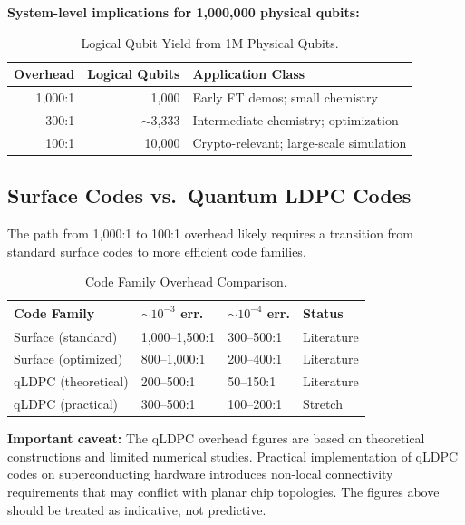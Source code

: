 \documentclass[conference]{IEEEtran}
\begin{document}
\textbf{System-level implications for 1,000,000 physical qubits:}

\begin{table}[htbp]
\centering
\caption{Logical Qubit Yield from 1M Physical Qubits.}
\label{tab:logical_yield}
\begin{tabular}{rrp{3.5cm}}
\toprule
\textbf{Overhead} & \textbf{Logical Qubits} & \textbf{Application Class} \\
\midrule
1,000:1 & 1,000 & Early FT demos; small chemistry \\
300:1 & ${\sim}$3,333 & Intermediate chemistry; optimization \\
100:1 & 10,000 & Crypto-relevant; large-scale simulation \\
\bottomrule
\end{tabular}
\end{table}

\subsection{Surface Codes vs.\ Quantum LDPC Codes}

The path from 1,000:1 to 100:1 overhead likely requires a transition from standard surface codes to more efficient code families.

\begin{table}[htbp]
\centering
\caption{Code Family Overhead Comparison.}
\label{tab:code_families}
\begin{tabular}{lllp{1.5cm}}
\toprule
\textbf{Code Family} & \textbf{${\sim}10^{-3}$ err.} & \textbf{${\sim}10^{-4}$ err.} & \textbf{Status} \\
\midrule
Surface (standard) & 1,000--1,500:1 & 300--500:1 & Literature \\
Surface (optimized) & 800--1,000:1 & 200--400:1 & Literature \\
qLDPC (theoretical) & 200--500:1 & 50--150:1 & Literature \\
qLDPC (practical) & 300--500:1 & 100--200:1 & Stretch \\
\bottomrule
\end{tabular}
\end{table}

\textbf{Important caveat:} The qLDPC overhead figures are based on theoretical constructions and limited numerical studies. Practical implementation of qLDPC codes on superconducting hardware introduces non-local connectivity requirements that may conflict with planar chip topologies. The figures above should be treated as indicative, not predictive.
\end{document}
